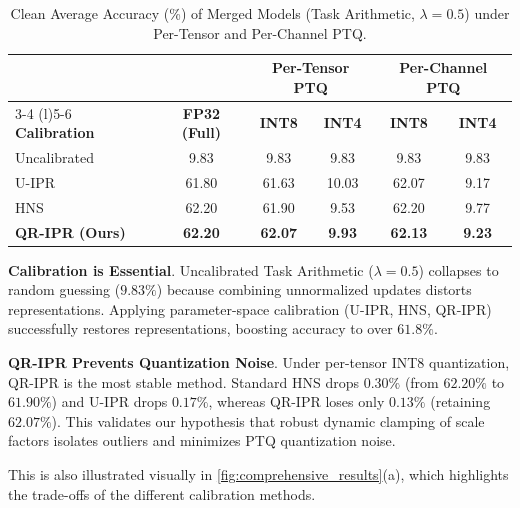 \documentclass{article}
\theoremstyle{plain}
\theoremstyle{definition}
\theoremstyle{remark}
\begin{document}
\vspace{-1.5mm}
\begin{table}[t]
\caption{Clean Average Accuracy (\%) of Merged Models (Task Arithmetic, $\lambda=0.5$) under Per-Tensor and Per-Channel PTQ.}
\label{tab:quantization}
\vspace{-2.5mm}
\begin{center}
\begin{scriptsize}
\renewcommand{\arraystretch}{0.78}
\begin{tabular}{lccccc}
\toprule
 & & \multicolumn{2}{c}{\textbf{Per-Tensor PTQ}} & \multicolumn{2}{c}{\textbf{Per-Channel PTQ}} \\
\cmidrule(r){3-4} \cmidrule(l){5-6}
\textbf{Calibration} & \textbf{FP32 (Full)} & \textbf{INT8} & \textbf{INT4} & \textbf{INT8} & \textbf{INT4} \\
\midrule
Uncalibrated & 9.83 & 9.83 & 9.83 & 9.83 & 9.83 \\
U-IPR \cite{submission9} & 61.80 & 61.63 & 10.03 & 62.07 & 9.17 \\
HNS \cite{submission7} & 62.20 & 61.90 & 9.53 & 62.20 & 9.77 \\
\midrule
\textbf{QR-IPR (Ours)} & \textbf{62.20} & \textbf{62.07} & \textbf{9.93} & \textbf{62.13} & \textbf{9.23} \\
\bottomrule
\end{tabular}
\end{scriptsize}
\end{center}
\end{table}
\vspace{-1.5mm}

\textbf{Calibration is Essential}. Uncalibrated Task Arithmetic ($\lambda=0.5$) collapses to random guessing ($9.83\%$) because combining unnormalized updates distorts representations. Applying parameter-space calibration (U-IPR, HNS, QR-IPR) successfully restores representations, boosting accuracy to over $61.8\%$.

\textbf{QR-IPR Prevents Quantization Noise}. Under per-tensor INT8 quantization, QR-IPR is the most stable method. Standard HNS drops $0.30\%$ (from $62.20\%$ to $61.90\%$) and U-IPR drops $0.17\%$, whereas QR-IPR loses only $0.13\%$ (retaining $62.07\%$). This validates our hypothesis that robust dynamic clamping of scale factors isolates outliers and minimizes PTQ quantization noise.

This is also illustrated visually in \cref{fig:comprehensive_results}(a), which highlights the trade-offs of the different calibration methods.
\end{document}
